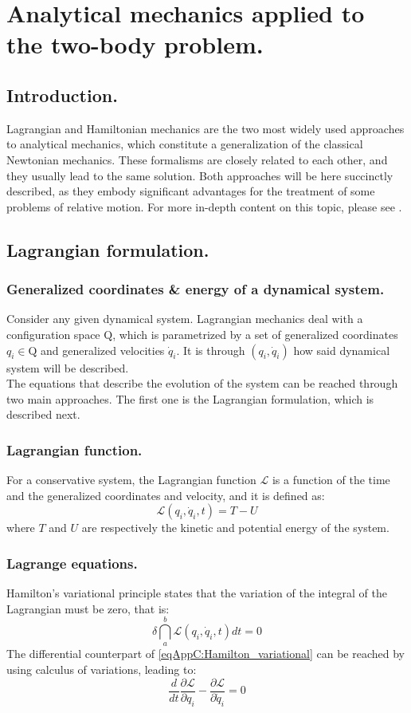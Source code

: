 \chapter{Analytical mechanics applied to the two-body problem.}
%
\label{app:App_C}
%
\section{Introduction.}
%
\indent Lagrangian and Hamiltonian mechanics are the two most widely used approaches to analytical mechanics, which constitute a generalization of the classical Newtonian mechanics. These formalisms are closely related to each other, and they usually lead to the same solution. Both approaches will be here succinctly described, as they embody significant advantages for the treatment of some problems of relative motion. For more in-depth content on this topic, please see \cite{Wiesel, SCFormationFlying}.
%
\section{Lagrangian formulation.}
%
%
	\subsection{Generalized coordinates \& energy of a dynamical system.}
	\indent Consider any given dynamical system. Lagrangian mechanics deal with a configuration space $\mathrm{Q}$, which is parametrized by a set of generalized coordinates $q_i\in \mathrm{Q}$ and generalized velocities $\dot{q}_i$. It is through $(q_i, \dot{q}_i)$ how said dynamical system will be described. \\
	\indent The equations that describe the evolution of the system can be reached through two main approaches. The first one is the Lagrangian formulation, which is described next.
	\subsection{Lagrangian function.}
	\indent For a conservative system, the Lagrangian function $\mathcal{L}$ is a function of the time and the generalized coordinates and velocity, and it is defined as:
	\[
	\mathcal{L} (q_i, \dot{q}_i, t) = T - U	
	\]
	\noindent where $T$ and $U$ are respectively the kinetic and potential energy of the system. 
	\subsection{Lagrange equations.}
	\indent Hamilton's variational principle states that the variation of the integral of the Lagrangian must be zero, that is: 
	\begin{equation}
	\delta \dint_a^b \mathcal{L}(q_i, \dot{q}_i, t) dt= 0
	\label{eqAppC:Hamilton_variational}
	\end{equation}
	\indent The differential counterpart of \eqref{eqAppC:Hamilton_variational} can be reached by using calculus of variations, leading to:
	\begin{equation}
	\label{eqAppC:Euler_lagrange}
	\dfrac{d}{dt} \dfrac{\partial \mathcal{L}}{\partial q_i} -\dfrac{\partial \mathcal{L}}{\partial \dot{q}_i} = 0
	\end{equation}
